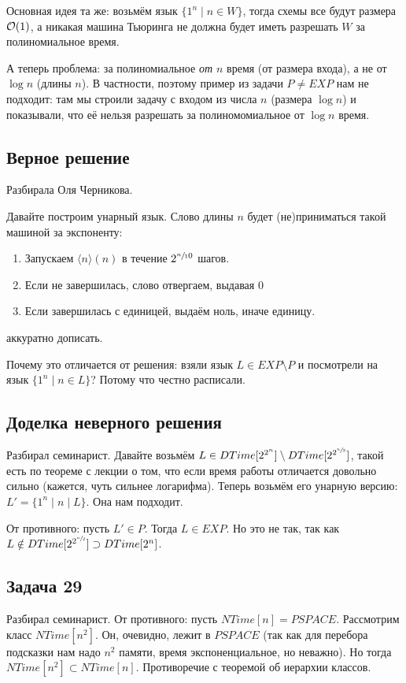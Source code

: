 		Основная идея та же: возьмём язык $\{1^n \mid n \in W\}$, тогда схемы все будут размера $\mathcal O(1)$,
		а никакая машина Тьюринга не должна будет иметь разрешать $W$ за полиномиальное время.

		А теперь проблема: за полиномиальное \textit{от $n$} время (от размера входа),
		а не от $\log n$ (длины $n$).
		В частности, поэтому пример из задачи $P \neq EXP$ нам не подходит:
		там мы строили задачу с входом из числа $n$ (размера $\log n$) и показывали,
		что её нельзя разрешать за полиномомиальное от $\log n$ время.

	\subsection{Верное решение}
		Разбирала Оля Черникова.

		Давайте построим унарный язык.
		Слово длины $n$ будет (не)приниматься такой машиной за экспоненту:
		\begin{enumerate}
			\item
				Запускаем $\langle n \rangle (n)$ в течение $2^{\sfrac n 10}$ шагов.
			\item
				Если не завершилась, слово отвергаем, выдавая 0
			\item
				Если завершилась с единицей, выдаём ноль, иначе единицу.
		\end{enumerate}
		\TODO аккуратно дописать.

		\begin{Rem}
			\TODO Почему это отличается от решения: взяли язык $L \in EXP \setminus P$ и посмотрели на язык $\{1^n \mid n \in L\}$?
			Потому что честно расписали.
		\end{Rem}

	\subsection{Доделка неверного решения}
		Разбирал семинарист.
		Давайте возьмём $L \in DTime[2^{2^n}] \setminus DTime[2^{2^{\sfrac n2}}]$,
		такой есть по теореме с лекции о том, что если время работы отличается довольно
		сильно (кажется, чуть сильнее логарифма).
		Теперь возьмём его унарную версию: $L' = \{ 1^n \mid n \mid L\}$.
		Она нам подходит.

		От противного: пусть $L' \in P$.
		Тогда $L \in EXP$.
		Но это не так, так как $L \notin DTime[2^{2^{\sfrac n2}}] \supset DTime[2^n]$.
		\TODO

\subsection{Задача 29}
	Разбирал семинарист.
	От противного: пусть $NTime[n] = PSPACE$.
	Рассмотрим класс $NTime[n^2]$.
	Он, очевидно, лежит в $PSPACE$ (так как для перебора подсказки нам надо $n^2$
	памяти, время экспоненциальное, но неважно).
	Но тогда $NTime[n^2] \subset NTime[n]$.
	Противоречие с теоремой об иерархии классов.

